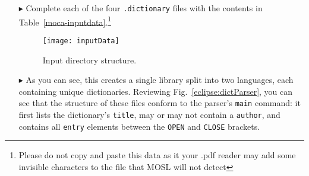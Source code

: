 \begin{itemize}
\item[$\blacktriangleright$] Complete each of the four \texttt{.dictionary} files with the contents in Table~\ref{moca-inputdata}.\footnote{Please do not copy
and paste this data as it your .pdf reader may add some invisible characters to the file that MOSL will not detect}

\begin{figure}[htp]
\begin{center}
  \texttt{[image: inputData]}
  \caption{Input directory structure.}
  \label{eclipse:textDirectory}
\end{center}
\end{figure}

\item[$\blacktriangleright$] As you can see, this creates a single library split into two languages, each containing unique dictionaries. Reviewing
Fig.~\ref{eclipse:dictParser}, you can see that the structure of these files conform to the parser's \texttt{main} command: it first lists the dictionary's
\texttt{title}, may or may not contain a \texttt{author}, and contains all \texttt{entry} elements between the \texttt{OPEN} and \texttt{CLOSE} brackets.

\end{itemize}

\newpage

